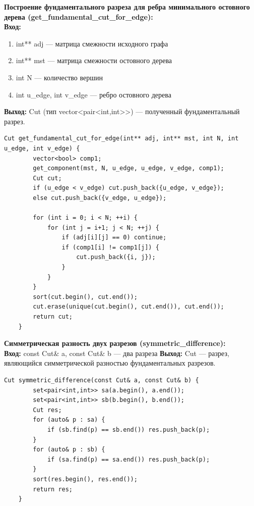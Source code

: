 \noindent\textbf{Построение фундаментального разреза для ребра минимального остовного дерева (get\_fundamental\_cut\_for\_edge):} \\
\noindent\textbf{Вход:}
\begin{enumerate}
	\item int** adj — матрица смежности исходного графа
	\item int** mst — матрица смежности остовного дерева
	\item int N — количество вершин
	\item int u\_edge, int v\_edge — ребро остовного дерева
\end{enumerate}
\noindent\textbf{Выход:}
Cut (тип vector<pair<int,int>>) — полученный фундаментальный разрез.

\begin{lstlisting}[caption=Фундаментальный разрез (cuts.cpp)]
	Cut get_fundamental_cut_for_edge(int** adj, int** mst, int N, int u_edge, int v_edge) {
		vector<bool> comp1;
		get_component(mst, N, u_edge, u_edge, v_edge, comp1);
		Cut cut;
		if (u_edge < v_edge) cut.push_back({u_edge, v_edge});
		else cut.push_back({v_edge, u_edge});
		
		for (int i = 0; i < N; ++i) {
			for (int j = i+1; j < N; ++j) {
				if (adj[i][j] == 0) continue;
				if (comp1[i] != comp1[j]) {
					cut.push_back({i, j});
				}
			}
		}
		sort(cut.begin(), cut.end());
		cut.erase(unique(cut.begin(), cut.end()), cut.end());
		return cut;
	}
\end{lstlisting}

\vspace*{20pt}

\noindent\textbf{Симметрическая разность двух разрезов (symmetric\_difference):} \\
\noindent\textbf{Вход:}
const Cut\& a, const Cut\& b — два разреза
\noindent\textbf{Выход:}
Cut — разрез, являющийся симметрической разностью фундаментальных разрезов.

\begin{lstlisting}[caption=Фундаментальный разрез (cuts.cpp)]
	Cut symmetric_difference(const Cut& a, const Cut& b) {
		set<pair<int,int>> sa(a.begin(), a.end());
		set<pair<int,int>> sb(b.begin(), b.end());
		Cut res;
		for (auto& p : sa) {
			if (sb.find(p) == sb.end()) res.push_back(p);
		}
		for (auto& p : sb) {
			if (sa.find(p) == sa.end()) res.push_back(p);
		}
		sort(res.begin(), res.end());
		return res;
	}
\end{lstlisting}

\vspace*{20pt}

